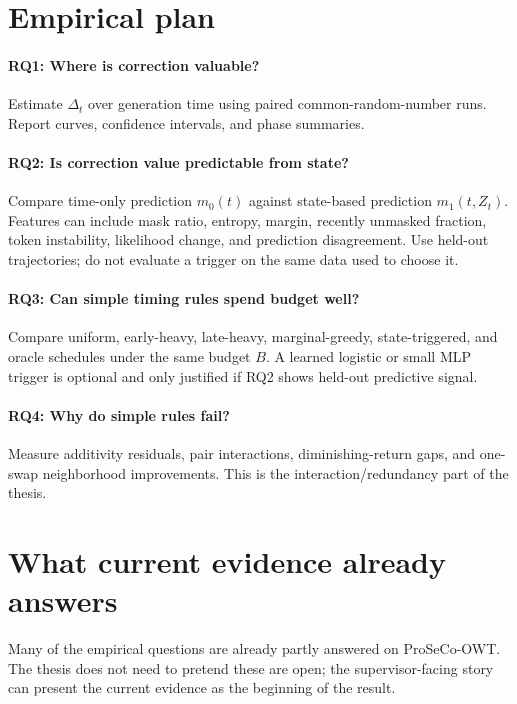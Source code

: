 \documentclass[11pt]{article}
\begin{document}
\section*{Empirical plan}

\paragraph{RQ1: Where is correction valuable?}
Estimate \(\Delta_t\) over generation time using paired common-random-number
runs.  Report curves, confidence intervals, and phase summaries.

\paragraph{RQ2: Is correction value predictable from state?}
Compare time-only prediction \(m_0(t)\) against state-based prediction
\(m_1(t,Z_t)\).  Features can include mask ratio, entropy, margin, recently
unmasked fraction, token instability, likelihood change, and prediction
disagreement.  Use held-out trajectories; do not evaluate a trigger on the
same data used to choose it.

\paragraph{RQ3: Can simple timing rules spend budget well?}
Compare uniform, early-heavy, late-heavy, marginal-greedy,
state-triggered, and oracle schedules under the same budget \(B\).  A learned
logistic or small MLP trigger is optional and only justified if RQ2 shows
held-out predictive signal.

\paragraph{RQ4: Why do simple rules fail?}
Measure additivity residuals, pair interactions, diminishing-return gaps, and
one-swap neighborhood improvements.  This is the interaction/redundancy part
of the thesis.

\section*{What current evidence already answers}

Many of the empirical questions are already partly answered on ProSeCo-OWT.
The thesis does not need to pretend these are open; the supervisor-facing
story can present the current evidence as the beginning of the result.
\end{document}
